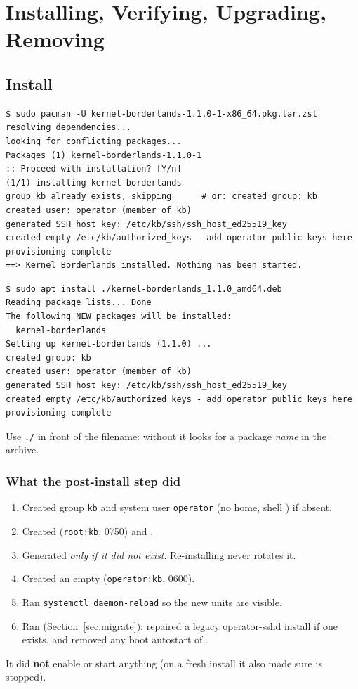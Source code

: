 \chapter{Installing, Verifying, Upgrading, Removing}
\label{ch:install}

\section{Install}
\ifarch
\begin{lstlisting}[style=console]
$ sudo pacman -U kernel-borderlands-1.1.0-1-x86_64.pkg.tar.zst
resolving dependencies...
looking for conflicting packages...
Packages (1) kernel-borderlands-1.1.0-1
:: Proceed with installation? [Y/n]
(1/1) installing kernel-borderlands
group kb already exists, skipping      # or: created group: kb
created user: operator (member of kb)
generated SSH host key: /etc/kb/ssh/ssh_host_ed25519_key
created empty /etc/kb/authorized_keys - add operator public keys here
provisioning complete
==> Kernel Borderlands installed. Nothing has been started.
\end{lstlisting}
\else
\begin{lstlisting}[style=console]
$ sudo apt install ./kernel-borderlands_1.1.0_amd64.deb
Reading package lists... Done
The following NEW packages will be installed:
  kernel-borderlands
Setting up kernel-borderlands (1.1.0) ...
created group: kb
created user: operator (member of kb)
generated SSH host key: /etc/kb/ssh/ssh_host_ed25519_key
created empty /etc/kb/authorized_keys - add operator public keys here
provisioning complete
\end{lstlisting}
Use \texttt{./} in front of the filename: without it  looks for a package \emph{name} in the archive.
\fi

\subsection{What the post-install step did}
\begin{enumerate}
\item Created group \texttt{kb} and system user \texttt{operator} (no home, shell ) if absent.
\item Created  (\texttt{root:kb}, 0750) and .
\item Generated  \emph{only if it did not exist}. Re-installing never rotates it.
\item Created an empty  (\texttt{operator:kb}, 0600).
\item Ran \texttt{systemctl daemon-reload} so the new units are visible.
\item Ran  (Section~\ref{sec:migrate}): repaired a legacy operator-sshd install if one exists, and removed any boot autostart of .
\end{enumerate}
It did \textbf{not} enable or start anything (on a fresh install it also made sure  is stopped).

